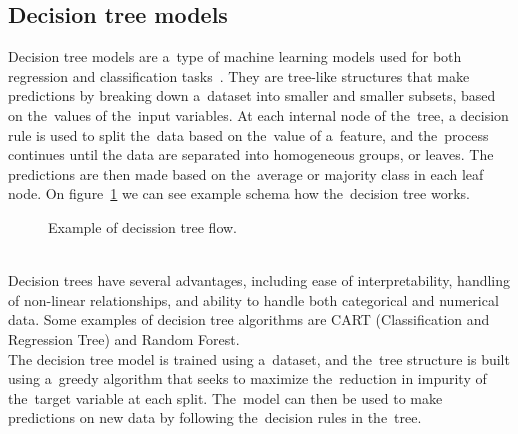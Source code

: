 \subsection{Decision tree models}\label{sec:trees}
Decision tree models are a~type of machine learning models used for both regression and classification
tasks~\cite{Kotsiantis}. They are tree-like structures that make predictions by breaking down a~dataset into
smaller and smaller subsets, based on the~values of the~input variables. At each internal node of the~tree,
a decision rule is used to split the~data based on the~value of a~feature, and the~process continues until the
data are separated into homogeneous groups, or leaves.
The predictions are then made based on the~average or majority class in each leaf node. On figure~\ref{fig:example_tree} we can see example schema how the~decision tree works.\\
\begin{figure}
    \centering
    \caption{Example of decission tree flow.}\label{fig:example_tree}
\end{figure}
\\
Decision trees have several advantages, including ease of interpretability, handling of non-linear relationships,
and ability to handle both categorical and numerical data. Some examples of decision tree algorithms are CART
(Classification and Regression Tree) and Random Forest.
\\
The decision tree model is trained using a~dataset, and the~tree structure is built using a~greedy algorithm
that seeks to maximize the~reduction in impurity of the~target variable at each split. The~model can then be used
to make predictions on new data by following the~decision rules in the~tree.
